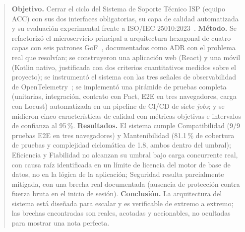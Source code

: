 \begin{abstract}
\noindent
\textbf{Objetivo.} Cerrar el ciclo del Sistema de Soporte Técnico ISP (equipo ACC) con sus dos
interfaces obligatorias, su capa de calidad automatizada y su evaluación experimental frente a
ISO/IEC 25010:2023~\cite{iso25010}. \textbf{Método.} Se refactorizó el microservicio principal a
arquitectura hexagonal de cuatro capas con seis patrones GoF~\cite{gamma1994patterns},
documentados como ADR con el problema real que resolvían; se construyeron una aplicación web
(React) y una móvil (Kotlin nativo, justificada con dos criterios cuantitativos medidos sobre el
proyecto); se instrumentó el sistema con las tres señales de observabilidad de
OpenTelemetry~\cite{opentelemetry2024spec}; se implementó una pirámide de pruebas completa
(unitarias, integración, contrato con Pact, E2E en tres navegadores, carga con Locust) automatizada
en un pipeline de CI/CD de siete \emph{jobs}; y se midieron cinco características de calidad con
métricas objetivas e intervalos de confianza al 95\,\%. \textbf{Resultados.} El sistema cumple
Compatibilidad (9/9 pruebas E2E en tres navegadores) y Mantenibilidad (81.1\,\% de cobertura de
pruebas y complejidad ciclomática de 1.8, ambos dentro del umbral); Eficiencia y Fiabilidad no
alcanzan su umbral bajo
carga concurrente real, con causa raíz identificada en un límite de licencia del motor de base de
datos, no en la lógica de la aplicación; Seguridad resulta parcialmente mitigada, con una brecha
real documentada (ausencia de protección contra fuerza bruta en el inicio de sesión).
\textbf{Conclusión.} La arquitectura del sistema está diseñada para escalar y es verificable de
extremo a extremo; las brechas encontradas son reales, acotadas y accionables, no ocultadas para
mostrar una nota perfecta.
\end{abstract}

